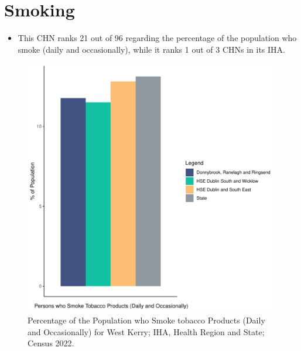 \documentclass{article}
\begin{document}
\pagebreak

\section{Smoking}\label{sect:Smoking}
\begin{itemize}
\item This CHN ranks  21 out of 96 regarding the percentage of the population who smoke (daily and occasionally), while it ranks   1 out of 3 CHNs in its IHA.
\end{itemize}
\begin{figure}[H]
	\centering
	\includegraphics[width = 120mm]{../figures/SmokingED.pdf}
	\caption{Percentage of the Population who Smoke tobacco Products (Daily and Occasionally) for West Kerry; IHA, Health Region and State; Census 2022.}
	\label{fig:2ae19629-1a6a-13a3-e055-000000000001}
	\end{figure}
	
\end{document}
